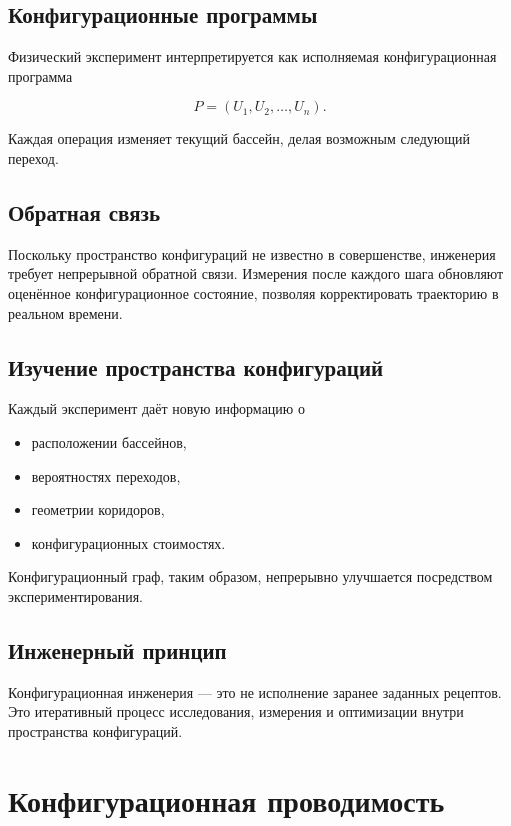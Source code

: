 \section{Конфигурационные программы}

Физический эксперимент интерпретируется как исполняемая конфигурационная программа

\[ \boxed{ P= (U_1,U_2,\ldots,U_n). } \]

Каждая операция изменяет текущий бассейн, делая возможным следующий переход.

\section{Обратная связь}

Поскольку пространство конфигураций не известно в совершенстве, инженерия требует непрерывной обратной связи. Измерения после каждого шага обновляют оценённое конфигурационное состояние, позволяя корректировать траекторию в реальном времени.

\section{Изучение пространства конфигураций}

Каждый эксперимент даёт новую информацию о

\begin{itemize}
\item расположении бассейнов,
\item вероятностях переходов,
\item геометрии коридоров,
\item конфигурационных стоимостях.
\end{itemize}

Конфигурационный граф, таким образом, непрерывно улучшается посредством экспериментирования.

\section{Инженерный принцип}

Конфигурационная инженерия — это не исполнение заранее заданных рецептов. Это итеративный процесс исследования, измерения и оптимизации внутри пространства конфигураций.

\chapter{Конфигурационная проводимость}

